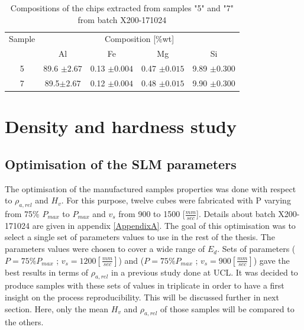  \begin{center}
\begin{table}[ht]
\centering
\begin{tabular}{|c|c|c |c |c| }
    \hline
    Sample& \multicolumn{4}{c}{Composition [\%wt]} \vline\\
    \cline{2-5}
    & Al& Fe&Mg&Si\\
\hline 
\hline   
    5 & 89.6 $\pm 2.67$&0.13 $\pm 0.004$& 0.47 $\pm 0.015$ &9.89 $\pm 0.300$\\
        7 & 89.5$\pm 2.67$&0.12 $\pm 0.004$& 0.48 $\pm 0.015$ &9.90 $\pm 0.300$\\
    \hline
\end{tabular}

\caption[Compositions of the chips extracted from samples "5" and "7" from batch X200-171024]{Compositions of the chips extracted from samples "5" and "7" from batch X200-171024}
\label{tab:chip}
\end{table}
 \end{center}



\section{Density and hardness study}
\subsection{Optimisation of the SLM parameters}
\label{Rparaopti}
The optimisation of the manufactured samples properties was done with respect to $\rho_{a,rel}$ and $H_v$. For this purpose, twelve cubes were fabricated with P varying from 75\% $P_{max} $ to $P_{max}$ and $v_s$ from 900 to 1500 [$\frac{mm}{sec}$]. Details about batch X200-171024 are given in appendix \ref{AppendixA}. The goal of this optimisation was to select a single set of parameters values to use in the rest of the thesis. The parameters values were chosen to cover a wide range of $E_d$. Sets of parameters ($P=75\% P_{max}$ ; $v_s=1200 [\frac{mm}{sec}]$) and ($P=75\% P_{max}$ ; $v_s=900 [\frac{mm}{sec}]$) gave the best results in terms of $\rho_{a,rel}$ in a previous study done at UCL. It was decided to produce samples with these sets of values in triplicate in order to have a first insight on the process reproducibility. This will be discussed further in next section. Here, only the mean $H_v$ and $\rho_{a,rel}$ of those samples will be compared to the others.\\

